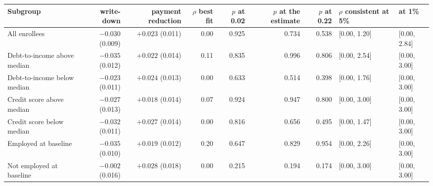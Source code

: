 \begin{tabular}{lrrrrrrll}
\toprule
Subgroup & write-down & payment reduction & $\rho$ best fit & $p$ at 0.02 & $p$ at the estimate & $p$ at 0.22 & $\rho$ consistent at 5\% & at 1\% \\
\midrule
All enrollees & $-0.030$ (0.009) & $+0.023$ (0.011) & 0.00 & 0.925 & 0.734 & 0.538 & [0.00, 1.20] & [0.00, 2.84] \\
Debt-to-income above median & $-0.035$ (0.012) & $+0.022$ (0.014) & 0.11 & 0.835 & 0.996 & 0.806 & [0.00, 2.54] & [0.00, 3.00] \\
Debt-to-income below median & $-0.023$ (0.011) & $+0.024$ (0.013) & 0.00 & 0.633 & 0.514 & 0.398 & [0.00, 1.76] & [0.00, 3.00] \\
Credit score above median & $-0.027$ (0.013) & $+0.018$ (0.014) & 0.07 & 0.924 & 0.947 & 0.800 & [0.00, 3.00] & [0.00, 3.00] \\
Credit score below median & $-0.032$ (0.011) & $+0.027$ (0.014) & 0.00 & 0.816 & 0.656 & 0.495 & [0.00, 1.47] & [0.00, 3.00] \\
Employed at baseline & $-0.035$ (0.010) & $+0.019$ (0.012) & 0.20 & 0.647 & 0.829 & 0.954 & [0.00, 2.26] & [0.00, 3.00] \\
Not employed at baseline & $-0.002$ (0.016) & $+0.028$ (0.018) & 0.00 & 0.215 & 0.194 & 0.174 & [0.00, 3.00] & [0.00, 3.00] \\
\bottomrule
\end{tabular}
